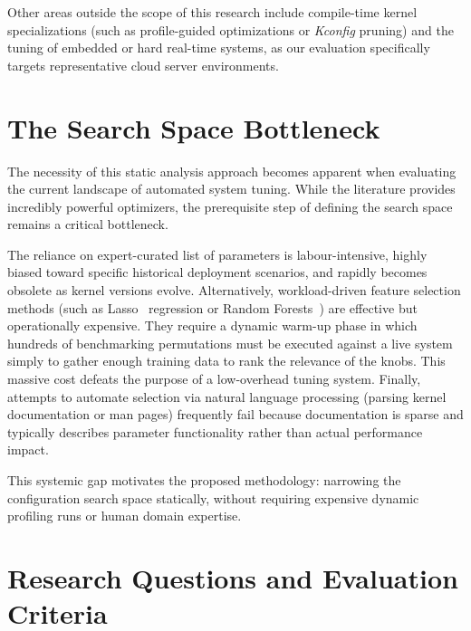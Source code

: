 Other areas outside the scope of this research include compile-time kernel specializations (such as profile-guided optimizations or \textit{Kconfig} pruning) and the tuning of embedded or hard real-time systems, as our evaluation specifically targets representative cloud server environments.

\section{The Search Space Bottleneck}

The necessity of this static analysis approach becomes apparent when evaluating the current landscape of automated system tuning.
While the literature provides incredibly powerful optimizers, the prerequisite step of defining the search space remains a critical bottleneck.

The reliance on expert-curated list of parameters is labour-intensive, highly biased toward specific historical deployment scenarios, and rapidly becomes obsolete as kernel versions evolve.
Alternatively, workload-driven feature selection methods (such as Lasso~\cite{lasso} regression or Random Forests~\cite{random_forests}) are effective but operationally expensive.
They require a dynamic warm-up phase in which hundreds of benchmarking permutations must be executed against a live system simply to gather enough training data to rank the relevance of the knobs.
This massive cost defeats the purpose of a low-overhead tuning system.
Finally, attempts to automate selection via natural language processing (parsing kernel documentation or man pages) frequently fail because documentation is sparse and typically describes parameter functionality rather than actual performance impact.

This systemic gap motivates the proposed methodology: narrowing the configuration search space statically, without requiring expensive dynamic profiling runs or human domain expertise.

\section{Research Questions and Evaluation Criteria}

